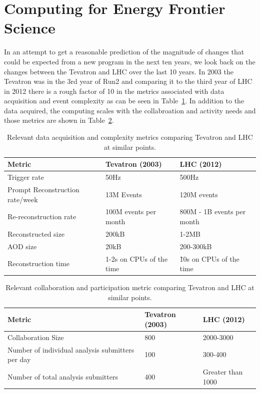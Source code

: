 
\section{Computing for Energy Frontier Science}

In an attempt to get a reasonable prediction of the magnitude of
changes that could be expected from a new program in the next ten
years, we look back on the changes between the Tevatron and LHC over
the last 10 years.  In 2003 the Tevatron was in the 3rd year of Run2
and comparing it to the third year of LHC in 2012 there is a rough
factor of 10 in the metrics associated with data acquisition and event
complexity as can be seen in Table~\ref{tab:compare_daq}. In addition
to the data acquired, the computing scales with the collabroation and
activity needs and those metrics are shown in
Table~\ref{tab:compare_coll}.

\begin{table}[t]
\begin{center}
\begin{tabular}{lll}
Metric & Tevatron (2003) & LHC (2012) \\ \hline
Trigger rate & 50Hz & 500Hz \\
Prompt Reconstruction rate/week & 13M Events & 120M events \\
Re-reconstruction rate & 100M events per month & 800M - 1B events per month \\
Reconstructed size & 200kB & 1-2MB \\
AOD size & 20kB & 200-300kB \\
Reconstruction time & 1-2s on CPUs of the time & \~ 10s on CPUs of the time \\ \hline
\end{tabular}
\caption{Relevant data acquisition and complexity metrics comparing Tevatron and LHC at similar points.}
\label{tab:compare_daq}
\end{center}
\end{table}


\begin{table}[t]
\begin{center}
\begin{tabular}{lll}
Metric & Tevatron (2003) & LHC (2012) \\ \hline
Collaboration Size & 800 & 2000-3000 \\
Number of individual analysis submitters per day & 100 & 300-400 \\
Number of total analysis submitters & 400 & Greater than 1000 \\ \hline
\end{tabular}
\caption{Relevant collaboration and participation metric comparing Tevatron and LHC at similar points.}
\label{tab:compare_coll}
\end{center}
\end{table}

